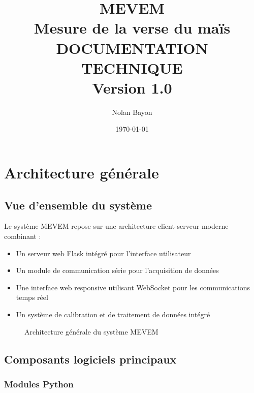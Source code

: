 \documentclass[12pt,a4paper]{article}
\title{%
    \vspace{-2cm}
    {\Huge \textbf{MEVEM}}\\[0.5cm]
    {\Large Mesure de la verse du maïs}\\[0.3cm]
    {\Large \textbf{DOCUMENTATION TECHNIQUE}}\\[0.5cm]
    {\normalsize Version 1.0}
}
\author{Nolan Bayon}
\date{\today}
\begin{document}
\maketitle
\thispagestyle{empty}

\newpage
\tableofcontents
\newpage

\section{Architecture générale}

\subsection{Vue d'ensemble du système}

Le système MEVEM repose sur une architecture client-serveur moderne combinant :
\begin{itemize}
    \item Un serveur web Flask intégré pour l'interface utilisateur
    \item Un module de communication série pour l'acquisition de données
    \item Une interface web responsive utilisant WebSocket pour les communications temps réel
    \item Un système de calibration et de traitement de données intégré
\end{itemize}

\begin{figure}[H]
    \centering
    \caption{Architecture générale du système MEVEM}
    \label{fig:architecture}
\end{figure}

\subsection{Composants logiciels principaux}

\subsubsection{Modules Python}
\end{document}

